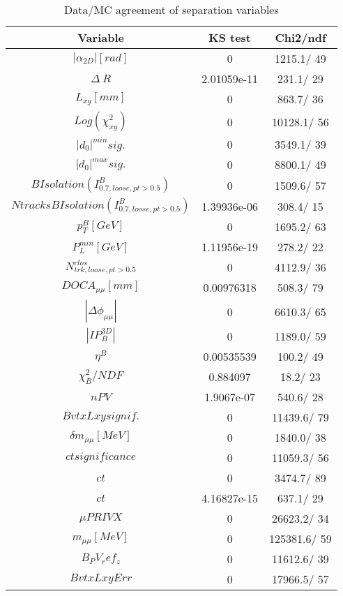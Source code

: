 \documentclass{article}
\begin{document}
\begin{table}[htbp]
\caption{\label{tab:sepVars}Data/MC agreement of separation variables}
\begin{center}
\begin{tabular}{c|c|c}
Variable & KS test & Chi2/ndf \\
\hline
$|\alpha_{2D}| [rad]$ & 0 & 1215.1/ 49\\
\hline
$\Delta~R$ & 2.01059e-11 & 231.1/ 29\\
\hline
$L_{xy} [mm]$ & 0 & 863.7/ 36\\
\hline
$Log(\chi^{2}_{xy})$ & 0 & 10128.1/ 56\\
\hline
$|d_{0}|^{min} sig.$ & 0 & 3549.1/ 39\\
\hline
$|d_{0}|^{max} sig.$ & 0 & 8800.1/ 49\\
\hline
$B Isolation (I^{B}_{0.7, loose, pt>0.5})$ & 0 & 1509.6/ 57\\
\hline
$Ntracks B Isolation (I^{B}_{0.7, loose, pt>0.5})$ & 1.39936e-06 & 308.4/ 15\\
\hline
$p_{T}^{B} [GeV]$ & 0 & 1695.2/ 63\\
\hline
$P^{min}_{L} [GeV]$ & 1.11956e-19 & 278.2/ 22\\
\hline
$N^{clos}_{trk, loose, pt>0.5}$ & 0 & 4112.9/ 36\\
\hline
$DOCA_{\mu\mu} [mm]$ & 0.00976318 & 508.3/ 79\\
\hline
$|\Delta\phi_{\mu\mu}|$ & 0 & 6610.3/ 65\\
\hline
$|IP_{B}^{3D}|$ & 0 & 1189.0/ 59\\
\hline
$\eta^{B}$ & 0.00535539 & 100.2/ 49\\
\hline
$\chi^{2}_{B}/NDF$ & 0.884097 &  18.2/ 23\\
\hline
$nPV$ & 1.9067e-07 & 540.6/ 28\\
\hline
$BvtxLxy signif.$ & 0 & 11439.6/ 79\\
\hline
$\delta m_{\mu\mu} [MeV]$ & 0 & 1840.0/ 38\\
\hline
$ct significance$ & 0 & 11059.3/ 56\\
\hline
$ct$ & 0 & 3474.7/ 89\\
\hline
$ct$ & 4.16827e-15 & 637.1/ 29\\
\hline
$\mu PRIVX$ & 0 & 26623.2/ 34\\
\hline
$m_{\mu\mu} [MeV]$ & 0 & 125381.6/ 59\\
\hline
$B_PV_ref_z$ & 0 & 11612.6/ 39\\
\hline
$BvtxLxyErr$ & 0 & 17966.5/ 57\\

\end{tabular}
\end{center}
\end{table}
\end{document}
